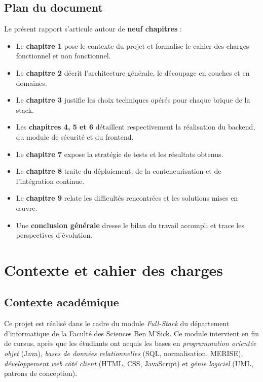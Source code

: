 \documentclass[11pt,a4paper,oneside]{report}
\begin{document}
\section*{Plan du document}

Le présent rapport s'articule autour de \textbf{neuf chapitres} :

\begin{itemize}[leftmargin=*]
  \item Le \textbf{chapitre 1} pose le contexte du projet et formalise le
    cahier des charges fonctionnel et non fonctionnel.
  \item Le \textbf{chapitre 2} décrit l'architecture générale, le découpage
    en couches et en domaines.
  \item Le \textbf{chapitre 3} justifie les choix techniques opérés pour
    chaque brique de la stack.
  \item Les \textbf{chapitres 4, 5 et 6} détaillent respectivement la
    réalisation du backend, du module de sécurité et du frontend.
  \item Le \textbf{chapitre 7} expose la stratégie de tests et les résultats
    obtenus.
  \item Le \textbf{chapitre 8} traite du déploiement, de la conteneurisation
    et de l'intégration continue.
  \item Le \textbf{chapitre 9} relate les difficultés rencontrées et les
    solutions mises en \oe uvre.
  \item Une \textbf{conclusion générale} dresse le bilan du travail
    accompli et trace les perspectives d'évolution.
\end{itemize}

\chapter{Contexte et cahier des charges}

\section{Contexte académique}

Ce projet est réalisé dans le cadre du module \textit{Full-Stack} du
département d'informatique de la Faculté des Sciences Ben M'Sick. Ce module
intervient en fin de cursus, après que les étudiants ont acquis les bases
en \textit{programmation orientée objet} (Java), \textit{bases de données
relationnelles} (SQL, normalisation, MERISE), \textit{développement web
côté client} (HTML, CSS, JavaScript) et \textit{génie logiciel}
(UML, patrons de conception).
\end{document}
